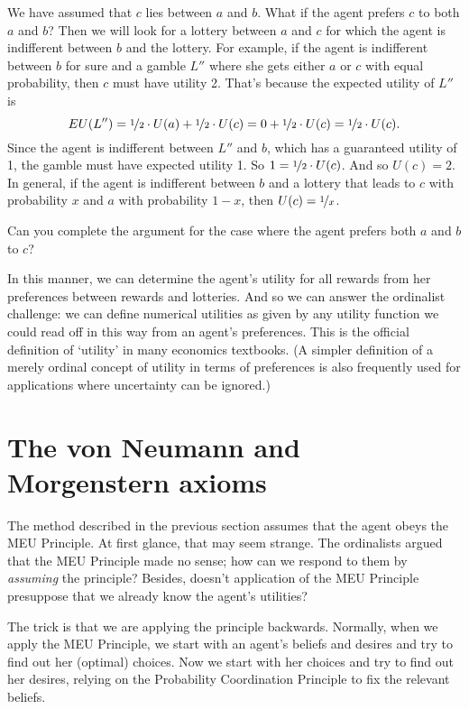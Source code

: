 We have assumed that $c$ lies between $a$ and $b$. What if the agent
prefers $c$ to both $a$ and $b$? Then we will look for a lottery between
$a$ and $c$ for which the agent is indifferent between $b$ and the
lottery. For example, if the agent is indifferent between $b$ for sure
and a gamble $L''$ where she gets either $a$ or $c$ with equal
probability, then $c$ must have utility 2. That's because the expected
utility of $L''$ is
\[
  EU(L'') = \nicefrac{1}{2} \cdot U(a) + \nicefrac{1}{2} \cdot U(c) =  
  0 + \nicefrac{1}{2} \cdot U(c) = \nicefrac{1}{2} \cdot U(c). 
\]
Since the agent is indifferent between $L''$ and $b$, which has a
guaranteed utility of 1, the gamble must have expected utility 1. So
$1 = \nicefrac{1}{2} \cdot U(c)$. And so $U(c) = 2$. In general, if
the agent is indifferent between $b$ and a lottery that leads to $c$
with probability $x$ and $a$ with probability $1-x$, then
$U(c) = \nicefrac{1}{x}$.


\begin{exercise2}
  Can you complete the argument for the case where the agent prefers
  both $a$ and $b$ to $c$?
\end{exercise2}

In this manner, we can determine the agent's utility for all rewards from her
preferences between rewards and lotteries. And so we can answer the ordinalist
challenge: we can define numerical utilities as given by any utility function we
could read off in this way from an agent's preferences. This is the official
definition of `utility' in many economics textbooks. (A simpler definition of a
merely ordinal concept of utility in terms of preferences is also frequently
used for applications where uncertainty can be ignored.)

\section{The von Neumann and Morgenstern axioms}\label{sec:vnm}

The method described in the previous section assumes that the agent
obeys the MEU Principle. At first glance, that may seem strange. The
ordinalists argued that the MEU Principle made no sense; how can we
respond to them by \emph{assuming} the principle? Besides, doesn't
application of the MEU Principle presuppose that we already know the
agent's utilities?

The trick is that we are applying the principle backwards. Normally,
when we apply the MEU Principle, we start with an agent's beliefs and
desires and try to find out her (optimal) choices. Now we start with her
choices and try to find out her desires, relying on the Probability
Coordination Principle to fix the relevant beliefs.

